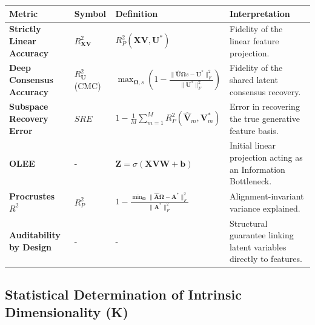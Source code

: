 \documentclass[
  letterpaper,
]{report}
\newcounter{none} %
\begin{document}
{\def\LTcaptype{none} %
\begin{longtable}[]{@{}
  >{\raggedright\arraybackslash}p{}
  >{\raggedright\arraybackslash}p{}
  >{\raggedright\arraybackslash}p{}
  >{\raggedright\arraybackslash}p{}@{}}
\toprule\noalign{}
\begin{minipage}[b]{\linewidth}\raggedright
Metric
\end{minipage} & \begin{minipage}[b]{\linewidth}\raggedright
Symbol
\end{minipage} & \begin{minipage}[b]{\linewidth}\raggedright
Definition
\end{minipage} & \begin{minipage}[b]{\linewidth}\raggedright
Interpretation
\end{minipage} \\
\midrule\noalign{}
\endhead
\bottomrule\noalign{}
\endlastfoot
\textbf{Strictly Linear Accuracy} & \(R^2_{\mathbf{XV}}\) &
\(R^2_P(\mathbf{X} \mathbf{V}, \mathbf{U}^*)\) & Fidelity of the linear
feature projection. \\
\textbf{Deep Consensus Accuracy} & \(R^2_{\mathbf{U}}\) (CMC) &
\(\max_{\mathbf{\Omega}, s} \left( 1 - \frac{\|\mathbf{\hat{U}}\mathbf{\Omega} s - \mathbf{U}^*\|_F^2}{\|\mathbf{U}^*\|_F^2} \right)\)
& Fidelity of the shared latent consensus recovery. \\
\textbf{Subspace Recovery Error} & \(SRE\) &
\(1 - \frac{1}{M} \sum_{m=1}^M R^2_P(\mathbf{\hat{V}}_m, \mathbf{V}^*_m)\)
& Error in recovering the true generative feature basis. \\
\textbf{OLEE} & - &
\(\mathbf{Z} = \sigma(\mathbf{X} \mathbf{V} \mathbf{W} + \mathbf{b})\) &
Initial linear projection acting as an Information Bottleneck. \\
\textbf{Procrustes \(R^2\)} & \(R^2_P\) &
\(1 - \frac{\min_{\mathbf{\Omega}} \|\mathbf{\hat{A}}\mathbf{\Omega} - \mathbf{A}^*\|_F^2}{\|\mathbf{A}^*\|_F^2}\)
& Alignment-invariant variance explained. \\
\textbf{Auditability by Design} & - & - & Structural guarantee linking
latent variables directly to features. \\
\end{longtable}
}

\subsection{Statistical Determination of Intrinsic Dimensionality
(K)}\label{statistical-determination-of-intrinsic-dimensionality-k}
\end{document}
